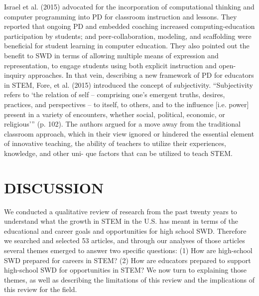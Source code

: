 \documentclass[11.5pt]{sig-alternate}
\begin{document}
\begin{large}
Israel et al. (2015) advocated for the incorporation of computational thinking and computer programming into PD for classroom instruction and lessons. They reported that ongoing PD and embedded coaching increased computing-education participation by students; and peer-collaboration, modeling, and scaffolding were beneficial for student learning in computer education. They also pointed out the benefit to SWD in terms of allowing multiple means of expression and representation, to engage students using both explicit instruction and open-inquiry approaches. In that vein, describing a new framework of PD for educators in STEM, Fore, et al. (2015) introduced the concept of subjectivity. “Subjectivity refers to ‘the relation of self – comprising one's emergent truths, desires, practices, and perspectives – to itself, to others, and to the influence [i.e. power] present in a variety of encounters, whether social, political, economic, or religious’” (p. 102). The authors argued for a move away from the traditional classroom approach, which in their view ignored or hindered the essential element of innovative teaching, the ability of teachers to utilize their experiences, knowledge, and other uni- que factors that can be utilized to teach STEM.    

\section*{DISCUSSION}
We conducted a qualitative review of research from the past twenty years to understand what the growth in STEM in the U.S. has meant in terms of the educational and career goals and opportunities for high school SWD. Therefore we searched and selected 53 articles, and through our analyses of those articles several themes emerged to answer two specific questions: (1) How are high-school SWD prepared for careers in STEM? (2) How are educators prepared to support high-school SWD for opportunities in STEM? We now turn to explaining those themes, as well as describing the limitations of this review and the implications of this review for the field. 


\end{large}
\end{document}
